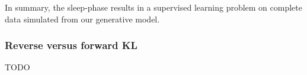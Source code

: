 In summary, the sleep-phase results in a supervised learning problem on complete data simulated from our generative model. 

\subsubsection{Reverse versus forward KL}
TODO

